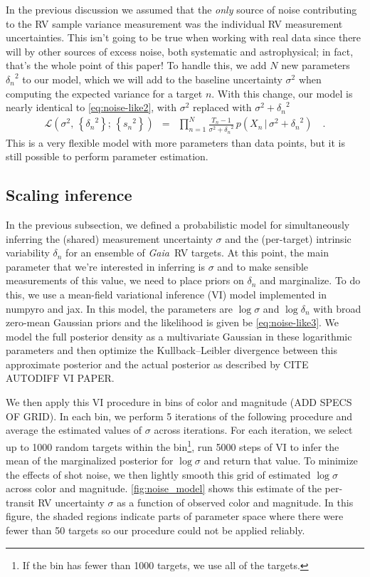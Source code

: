 \documentclass[modern, letterpaper]{aastex63}
\newcommand{\package}[1]{\textsf{#1}}
\newcommand{\project}[1]{\textsl{#1}}
\newcommand{\Gaia}{\project{Gaia}}
\begin{document}
In the previous discussion we assumed that the \emph{only} source of noise contributing to the RV sample variance measurement was the individual RV measurement uncertainties.
This isn't going to be true when working with real data since there will by other sources of excess noise, both systematic and astrophysical; in fact, that's the whole point of this paper!
To handle this, we add $N$ new parameters ${\delta_n}^2$ to our model, which we will add to the baseline uncertainty $\sigma^2$ when computing the expected variance for a target $n$.
With this change, our model is nearly identical to \autoref{eq:noise-like2}, with $\sigma^2$ replaced with $\sigma^2 + {\delta_n}^2$
\begin{eqnarray}
	\label{eq:noise-like3}
	\mathcal{L}(\sigma^2,\,\left\{{\delta_n}^2\right\};\,\left\{{s_n}^2\right\}) &=& \prod_{n=1}^N \frac{T_n - 1}{\sigma^2 + {\delta_n}^2}\,p(X_n\,|\,\sigma^2 + {\delta_n}^2) \quad.
\end{eqnarray}
This is a very flexible model with more parameters than data points, but it is still possible to perform parameter estimation.

\subsection{Scaling inference}

In the previous subsection, we defined a probabilistic model for simultaneously inferring the (shared) measurement uncertainty $\sigma$ and the (per-target) intrinsic variability $\delta_n$ for an ensemble of \Gaia\ RV targets.
At this point, the main parameter that we're interested in inferring is $\sigma$ and to make sensible measurements of this value, we need to place priors on $\delta_n$ and marginalize.
To do this, we use a mean-field variational inference (VI) model implemented in \package{numpyro} and \package{jax}.
In this model, the parameters are $\log \sigma$ and $\log \delta_n$ with broad zero-mean Gaussian priors and the likelihood is given be \autoref{eq:noise-like3}.
We model the full posterior density as a multivariate Gaussian in these logarithmic parameters and then optimize the Kullback--Leibler divergence between this approximate posterior and the actual posterior as described by CITE AUTODIFF VI PAPER.

We then apply this VI procedure in bins of color and magnitude (ADD SPECS OF GRID).
In each bin, we perform 5 iterations of the following procedure and average the estimated values of $\sigma$ across iterations.
For each iteration, we select up to 1000 random targets within the bin\footnote{If the bin has fewer than 1000 targets, we use all of the targets.}, run 5000 steps of VI to infer the mean of the marginalized posterior for $\log \sigma$ and return that value.
To minimize the effects of shot noise, we then lightly smooth this grid of estimated $\log \sigma$ across color and magnitude.
\autoref{fig:noise_model} shows this estimate of the per-transit RV uncertainty $\sigma$ as a function of observed color and magnitude.
In this figure, the shaded regions indicate parts of parameter space where there were fewer than 50 targets so our procedure could not be applied reliably.
\end{document}
